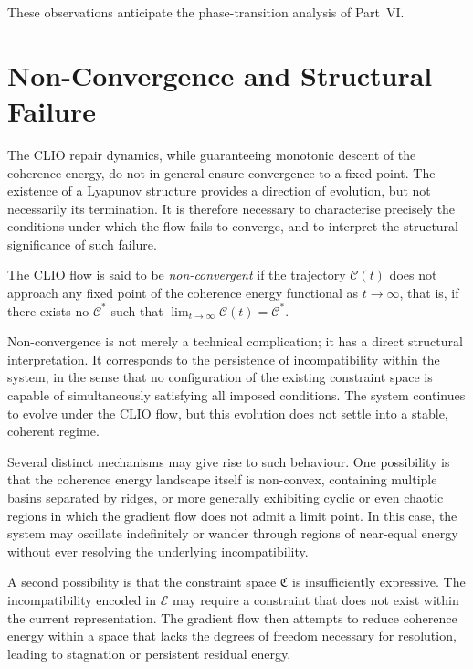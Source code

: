 \documentclass[11pt,openany]{book}
\begin{document}
These observations anticipate the phase-transition analysis
of Part~VI.

\section{Non-Convergence and Structural Failure}
\label{sec:failure}

The CLIO repair dynamics, while guaranteeing monotonic
descent of the coherence energy, do not in general ensure
convergence to a fixed point.  The existence of a Lyapunov
structure provides a direction of evolution, but not
necessarily its termination.  It is therefore necessary to
characterise precisely the conditions under which the flow
fails to converge, and to interpret the structural
significance of such failure.

\begin{definition}
The CLIO flow is said to be \emph{non-convergent} if the
trajectory $\mathcal{C}(t)$ does not approach any fixed
point of the coherence energy functional as
$t \to \infty$, that is, if there exists no
$\mathcal{C}^*$ such that
$\lim_{t \to \infty} \mathcal{C}(t) = \mathcal{C}^*$.
\end{definition}

Non-convergence is not merely a technical complication; it
has a direct structural interpretation.  It corresponds to
the persistence of incompatibility within the system, in the
sense that no configuration of the existing constraint
space is capable of simultaneously satisfying all imposed
conditions.  The system continues to evolve under the CLIO
flow, but this evolution does not settle into a stable,
coherent regime.

Several distinct mechanisms may give rise to such behaviour.
One possibility is that the coherence energy landscape
itself is non-convex, containing multiple basins separated
by ridges, or more generally exhibiting cyclic or even
chaotic regions in which the gradient flow does not admit a
limit point.  In this case, the system may oscillate
indefinitely or wander through regions of near-equal energy
without ever resolving the underlying incompatibility.

A second possibility is that the constraint space
$\mathfrak{C}$ is insufficiently expressive.  The
incompatibility encoded in $\mathcal{E}$ may require a
constraint that does not exist within the current
representation.  The gradient flow then attempts to reduce
coherence energy within a space that lacks the degrees of
freedom necessary for resolution, leading to stagnation or
persistent residual energy.
\end{document}
